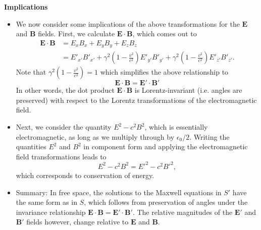 \documentclass[11pt, a4paper]{article}
\renewcommand{\vec}[1]{\bm{#1}} %
\newcommand{\E}{\vec{E}} %
\newcommand{\B}{\vec{B}} %
\newcommand{\ee}{\epsilon_{0}}  %
\begin{document}
\textbf{Implications}
\begin{itemize}
	\item We now consider some implications of the above transformations for the $ \E $ and $ \B $ fields. First, we calculate $ \E \cdot \B $, which comes out to
	\begin{align*}
		\E \cdot \B &= E_{x}B_{x} + E_{y}B_{y} + E_{z}B_{z} \\
		& = E'_{x'}B'_{x'} + \gamma^{2}\left(1 - \frac{v^{2}}{c^{2}}\right)E'_{y'}B'_{y'} + \gamma^{2}\left(1 - \frac{v^{2}}{c^{2}}\right)E'_{z'}B'_{z'}.
	\end{align*}
	Note that $ \gamma^{2}(1 - \frac{v^{2}}{c^{2}}) = 1 $ which simplifies the above relationship to
	\begin{equation*}
		\E \cdot \B = \E' \cdot \B'
	\end{equation*}
    In other words, the dot product $ \E \cdot \B $ is Lorentz-invariant (i.e. angles are preserved) with respect to the Lorentz transformations of the electromagnetic field.
	
	\item Next, we consider the quantity $ E^{2} - c^{2}B^{2} $, which is essentially electromagnetic, as long as we multiply through by $ \ee/2 $. Writing the quantities $ E^{2} $ and $ B^{2} $ in component form and applying the electromagnetic field transformations leads to
	\begin{equation*}
		 E^{2} - c^{2}B^{2} =  E'^{2} - c^{2}B'^{2},
	\end{equation*}
	which corresponds to conservation of energy. 
	

    \item Summary: In free space, the solutions to the Maxwell equations in $ S' $ have the same form as in $ S $, which follows from preservation of angles under the invariance relationship $ \E \cdot \B = \E' \cdot \B' $. The relative magnitudes of the $ \E' $ and $ \B' $ fields however, change relative to $ \E $ and $ \B $.
\end{itemize}
\end{document}

